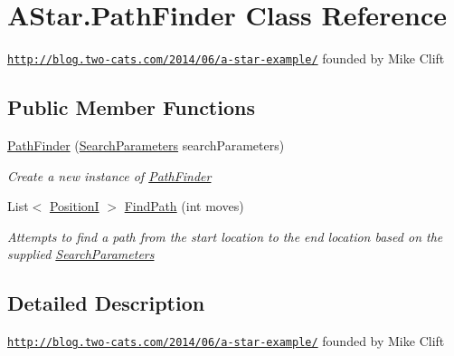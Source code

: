 \hypertarget{classAStar_1_1PathFinder}{\section{A\-Star.\-Path\-Finder Class Reference}
\label{classAStar_1_1PathFinder}
}


\href{http://blog.two-cats.com/2014/06/a-star-example/}{\tt http\-://blog.\-two-\/cats.\-com/2014/06/a-\/star-\/example/} founded by Mike Clift  


\subsection*{Public Member Functions}
\begin{DoxyCompactItemize}
\item 
\hyperlink{classAStar_1_1PathFinder_a56a02796dc128e54a9ff805dc1860ce3}{Path\-Finder} (\hyperlink{classAStar_1_1SearchParameters}{Search\-Parameters} search\-Parameters)
\begin{DoxyCompactList}\small\item\em Create a new instance of \hyperlink{classAStar_1_1PathFinder}{Path\-Finder} \end{DoxyCompactList}\item 
List$<$ \hyperlink{classCore_1_1Models_1_1PositionI}{Position\-I} $>$ \hyperlink{classAStar_1_1PathFinder_ab404a7887a779555af95a6e019e4b302}{Find\-Path} (int moves)
\begin{DoxyCompactList}\small\item\em Attempts to find a path from the start location to the end location based on the supplied \hyperlink{classAStar_1_1SearchParameters}{Search\-Parameters} \end{DoxyCompactList}\end{DoxyCompactItemize}


\subsection{Detailed Description}
\href{http://blog.two-cats.com/2014/06/a-star-example/}{\tt http\-://blog.\-two-\/cats.\-com/2014/06/a-\/star-\/example/} founded by Mike Clift 



